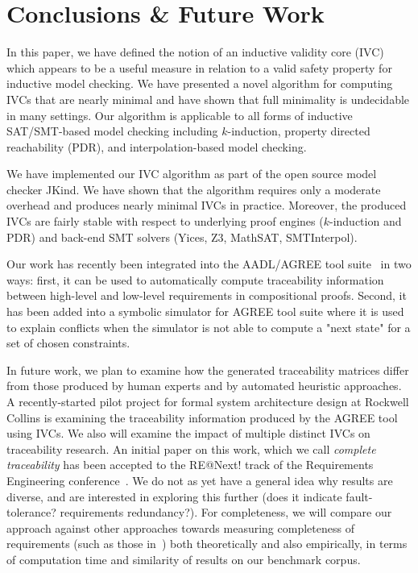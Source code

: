 \section{Conclusions \& Future Work}
\label{sec:conc}

In this paper, we have defined the notion of an inductive validity core (IVC) which
appears to be a useful measure in relation to a valid safety property
for inductive model checking. We have presented a novel algorithm for
computing IVCs that are nearly minimal and have shown that full
minimality is undecidable in many settings. Our algorithm is
applicable to all forms of inductive SAT/SMT-based model checking
including $k$-induction, property directed reachability (PDR), and
interpolation-based model checking.

We have implemented our IVC algorithm as part of the open source model
checker JKind. We have shown that the algorithm requires only a
moderate overhead and produces nearly minimal IVCs in practice.
Moreover, the produced IVCs are fairly stable with respect to
underlying proof engines ($k$-induction and PDR) and back-end SMT
solvers (Yices, Z3, MathSAT, SMTInterpol).

Our work has recently been integrated into the AADL/AGREE tool suite~\cite{QFCS15:backes,hilt2013} in two ways: first, it can be used to automatically compute traceability information between high-level and low-level requirements in compositional proofs.  Second, it has been added into a symbolic simulator for AGREE tool suite where it is used to explain conflicts when the simulator is not able to compute a "next state" for a set of chosen constraints.  

In future work, we plan to examine how the generated traceability matrices differ from those produced by human experts and by automated heuristic approaches.  A recently-started pilot project for formal system architecture design at Rockwell Collins is examining the traceability information produced by the AGREE tool using IVCs.  We also will examine the impact of multiple distinct IVCs on traceability research.  An initial paper on this work, which we call {\em complete traceability} has been accepted to the RE@Next! track of the Requirements Engineering conference~\cite{Murugesan16:renext}.  We do not as yet have a general idea why results are diverse, and are interested in exploring this further (does it indicate fault-tolerance? requirements redundancy?).  For completeness, we will compare our approach against other approaches towards measuring completeness of requirements (such as those in~\cite{chockler_coverage_2003, Kupferman:2006:SCF, kupferman_theory_2008}) both theoretically and also empirically, in terms of computation time and similarity of results on our benchmark corpus.

